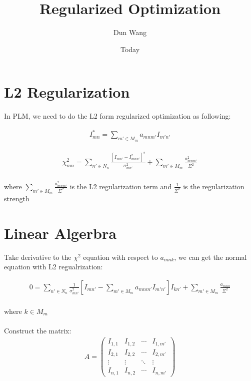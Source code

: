 \documentclass[]{article}
\begin{document}
\title{Regularized Optimization}
\author{Dun Wang}
\date{Today}
\maketitle

\section{L2 Regularization}

In PLM, we need to do the L2 form regularized optimization as following:

\begin{align*}
  I_{mn}^{*}=\sum_{m' \in M_{m}} a_{mnm'}I_{m'n'}
\end{align*}

\begin{align*}
  \chi^2_{mn}    = \sum_{n'\in{N}_n} \frac{[I_{mn'} - I^{\ast}_{mnn'}]^2}{\sigma^2_{mn'}} 
		+ \sum_{m'\in{M}_m} \frac{a_{mnm'}^2}{\Sigma^2}
\end{align*}
\\
where $\sum_{m' \in {M}_m} \frac{a_{mnm'}^2}{\Sigma^2}$ is the L2 regularization term and $\frac{1}{\Sigma^2}$ is the regularization strength


\section{Linear Algerbra}
Take derivative to the $\chi^2$ equation with respect to $a_{mnk}$,  we can get the normal equation with L2 regualrization:
 
\begin{align*}
  0   = \sum_{n'\in{N}_n} \frac{1}{\sigma^2_{mn'}}[I_{mn'} -  \sum_{m'\in{M}_m}a_{mnm'}I_{m'n'}]I_{kn'}
                 + \sum_{m'\in{M}_m} \frac{a_{mnk}}{\Sigma^2}
\end{align*}
\\
where $k \in{M}_m$
\\
\\
Construct the matrix:
\\
\begin{align*}
A=
 \begin{pmatrix}
  I_{1,1} & I_{1,2} & \cdots & I_{1,m'} \\
  I_{2,1} & I_{2,2} & \cdots & I_{2,m'} \\
  \vdots  & \vdots  & \ddots & \vdots  \\
  I_{n,1} & I_{n,2} & \cdots & I_{n,m'}
 \end{pmatrix}
\end{align*}
\end{document}
